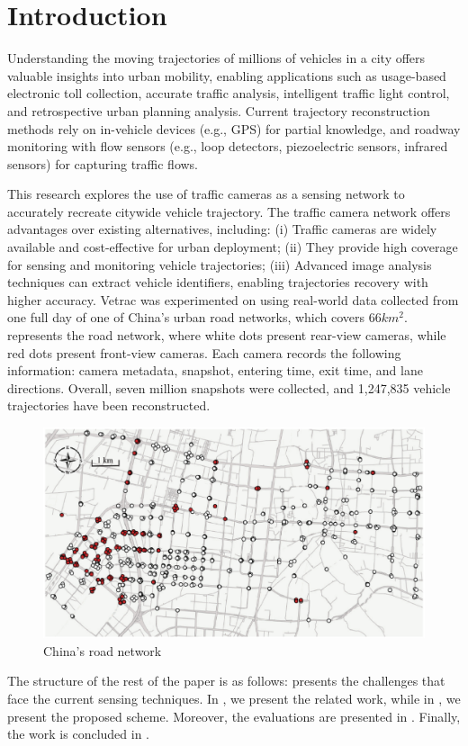 \section{Introduction}
\label{sec:introduction}
Understanding the moving trajectories of millions of vehicles in a city offers valuable insights into urban mobility, enabling applications such as usage-based electronic toll collection, accurate traffic analysis, intelligent traffic light control, and retrospective urban planning analysis.
Current trajectory reconstruction methods rely on in-vehicle devices (e.g., GPS) for partial knowledge, and roadway monitoring with flow sensors (e.g., loop detectors, piezoelectric sensors, infrared sensors) for capturing traffic flows.

This research explores the use of traffic cameras as a sensing network to accurately recreate citywide vehicle trajectory.
The traffic camera network offers advantages over existing alternatives, including: (i) Traffic cameras are widely available and cost-effective for urban deployment; (ii) They provide high coverage for sensing and monitoring vehicle trajectories; (iii) Advanced image analysis techniques can extract vehicle identifiers, enabling trajectories recovery with higher accuracy.
Vetrac was experimented on using real-world data collected from one full day of one of China's urban road networks, which covers $66 km^2$.
 represents the road network, where white dots present rear-view cameras, while red dots present front-view cameras.
Each camera records the following information: camera metadata, snapshot, entering time, exit time, and lane directions.
Overall, seven million snapshots were collected, and 1,247,835 vehicle trajectories have been reconstructed.

\begin{figure}
\centering
  \includegraphics[width=0.9\linewidth]{figures/china-road-network.eps}
  \caption{China's road network \cite{tong2021large}}
  \label{fig:china-road-representation}
\end{figure}

The structure of the rest of the paper is as follows:
 presents the challenges that face the current sensing techniques.
In , we present the related work, while in , we present the proposed scheme.
Moreover, the evaluations are presented in .
Finally, the work is concluded in .
